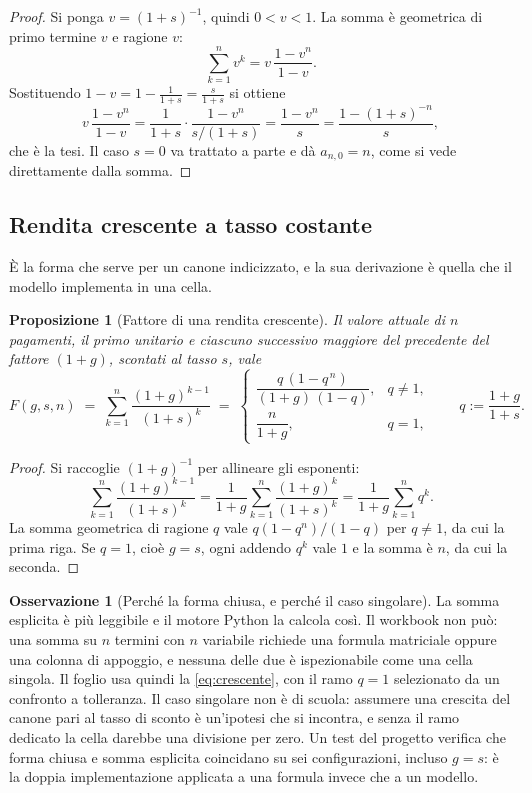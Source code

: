 \documentclass[11pt,a4paper]{article}
\theoremstyle{definition}
\newtheorem{osservazione}[definizione]{Osservazione}
\theoremstyle{plain}
\newtheorem{proposizione}[definizione]{Proposizione}
\begin{document}
\begin{proof}
Si ponga $v = (1+s)^{-1}$, quindi $0<v<1$. La somma è geometrica di primo termine $v$ e ragione $v$:
\[
\sum_{k=1}^{n} v^k = v\,\frac{1-v^n}{1-v} .
\]
Sostituendo $1-v = 1-\frac{1}{1+s} = \frac{s}{1+s}$ si ottiene
\[
v\,\frac{1-v^n}{1-v} = \frac{1}{1+s}\cdot\frac{1-v^n}{s/(1+s)} = \frac{1-v^n}{s} = \frac{1-(1+s)^{-n}}{s},
\]
che è la tesi. Il caso $s=0$ va trattato a parte e dà $a_{n,0}=n$, come si vede direttamente dalla somma.
\end{proof}

\subsection{Rendita crescente a tasso costante}

È la forma che serve per un canone indicizzato, e la sua derivazione è quella che il modello implementa in una cella.

\begin{proposizione}[Fattore di una rendita crescente]
Il valore attuale di $n$ pagamenti, il primo unitario e ciascuno successivo maggiore del precedente del fattore $(1+g)$, scontati al tasso $s$, vale
\begin{equation}
F(g,s,n) \;=\; \sum_{k=1}^{n} \frac{(1+g)^{k-1}}{(1+s)^k}
\;=\;
\begin{cases}
\dfrac{q\,(1-q^{\,n})}{(1+g)\,(1-q)}, & q \neq 1,\\[1.2em]
\dfrac{n}{1+g}, & q = 1,
\end{cases}
\qquad q := \frac{1+g}{1+s}.
\label{eq:crescente}
\end{equation}
\end{proposizione}

\begin{proof}
Si raccoglie $(1+g)^{-1}$ per allineare gli esponenti:
\[
\sum_{k=1}^{n} \frac{(1+g)^{k-1}}{(1+s)^k}
= \frac{1}{1+g}\sum_{k=1}^{n} \frac{(1+g)^{k}}{(1+s)^k}
= \frac{1}{1+g}\sum_{k=1}^{n} q^{k}.
\]
La somma geometrica di ragione $q$ vale $q(1-q^n)/(1-q)$ per $q\neq 1$, da cui la prima riga. Se $q=1$, cioè $g=s$, ogni addendo $q^k$ vale $1$ e la somma è $n$, da cui la seconda.
\end{proof}

\begin{osservazione}[Perché la forma chiusa, e perché il caso singolare]
La somma esplicita è più leggibile e il motore Python la calcola così. Il workbook non può: una somma su $n$ termini con $n$ variabile richiede una formula matriciale oppure una colonna di appoggio, e nessuna delle due è ispezionabile come una cella singola. Il foglio usa quindi la \eqref{eq:crescente}, con il ramo $q=1$ selezionato da un confronto a tolleranza. Il caso singolare non è di scuola: assumere una crescita del canone pari al tasso di sconto è un'ipotesi che si incontra, e senza il ramo dedicato la cella darebbe una divisione per zero. Un test del progetto verifica che forma chiusa e somma esplicita coincidano su sei configurazioni, incluso $g=s$: è la doppia implementazione applicata a una formula invece che a un modello.
\end{osservazione}
\end{document}
